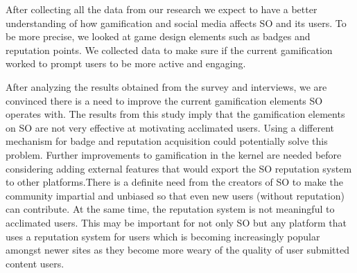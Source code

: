 \documentclass{sigchi}
\begin{document}
After collecting all the data from our research we expect to have a better understanding of how gamification and social media affects SO and its users. To be more precise, we looked at game design elements such as badges and reputation points. We collected data to make sure if the current gamification worked to prompt users to be more active and engaging.

After analyzing the results obtained from the survey and interviews, we are convinced there is a need to improve the current gamification elements SO operates with. The results from this study imply that the gamification elements on SO are not very effective at motivating acclimated users. Using a different mechanism for badge and reputation acquisition could potentially solve this problem. Further improvements to gamification in the kernel are needed before considering adding external features that would export the SO reputation system to other platforms.There is a definite need from the creators of SO to make the community impartial and unbiased so that even new users (without reputation) can contribute. At the same time, the reputation system is not meaningful to acclimated users. This may be important for not only SO but any platform that uses a reputation system for users which is becoming increasingly popular amongst newer sites as they become more weary of the quality of user submitted content users.






% 
% 
\end{document}
